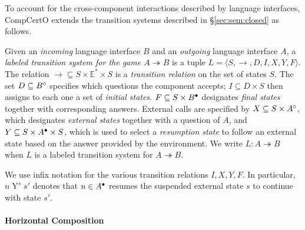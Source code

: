\documentclass[sigplan,screen]{acmart}
\newenvironment{optional}{}{}
\begin{document}
To account for the cross-component interactions
described by language interfaces,
CompCertO extends
the transition systems described in \S\ref{sec:sem:closed}
as follows.

\begin{definition} \label{def:lts}
Given an \emph{incoming} language interface $B$
and an \emph{outgoing} language interface $A$,
a \emph{labeled transition system for the game $A \twoheadrightarrow B$}
is a tuple $L = \langle S, \rightarrow, D, I, X, Y, F \rangle$.
The relation
${\rightarrow} \subseteq S \times \mathbb{E}^* \times S$ is
a \emph{transition relation} on the set of states $S$.
The set $D \subseteq B^\circ$ specifies which
questions the component accepts;
$I \subseteq D \times S$ then
assigns to each one a set of \emph{initial states}.
$F \subseteq S \times B^\bullet$
designates \emph{final states} together with corresponding answers.
External calls are specified by
$X \subseteq S \times A^\circ$,
which designates \emph{external states} together with
a question of $A$, and
$Y \subseteq S \times A^\bullet \times S$,
which is used to select a \emph{resumption state}
to follow an external state
based on the answer provided by the environment.
We write $L : A \twoheadrightarrow B$ when
$L$ is a labeled transition system for $A \twoheadrightarrow B$.
\end{definition}

We use infix notation for the various transition relations
$I, X, Y, F$.
In particular, $n \mathrel{Y}^s s'$
denotes that $n \in A^\bullet$
resumes the suspended external state $s$
to continue with state $s'$.



\paragraph{Horizontal Composition} \label{sec:sem:linker} %
\end{document}
